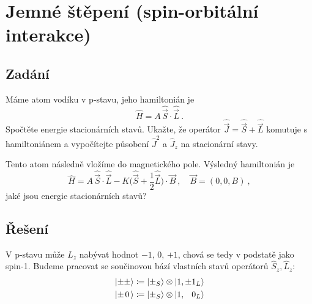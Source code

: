 \documentclass[10pt,a4paper]{article}
\def\ph{\phantom}
\newcommand*{\mask}[2]{%
    \mathord{\makebox[\widthof{\(#1\)}]{\(#2\)}}%
}
\newcommand{\ket}[1]{\left| #1 \right>}
\newcommand{\vechat}[1]{\hat{\vec{#1}}}
\def\0{\mask{+}{0}}
\begin{document}
\section{Jemné štěpení (spin-orbitální interakce)}

\subsection{Zadání}
Máme atom vodíku v p-stavu, jeho hamiltonián je
\begin{equation*}
    \hat H = A \, \vechat S \cdot \vechat L \: .
\end{equation*}
Spočtěte energie stacionárních stavů. Ukažte, že operátor $\vechat J = \vechat S + \vechat L$ komutuje s hamiltoniánem a vypočítejte působení $\hat J^2$ a $\hat J_z$ na stacionární stavy.

Tento atom následně vložíme do magnetického pole. Výsledný hamiltonián je
\begin{equation*}
    \hat H
    = A \, \vechat S \cdot \vechat L
    - K \big( \vechat S + \frac{1}{2} \vechat L \big) \cdot \vec B
    \: , \quad
    \vec B = (0, 0, B)
    \: ,
\end{equation*}
jaké jsou energie stacionárních stavů?

\subsection{Řešení}
V p-stavu může $L_z$ nabývat hodnot $-1$, $0$, $+1$, chová se tedy v podstatě jako spin-1. Budeme pracovat se součinovou bází vlastních stavů operátorů $\hat S_z, \hat L_z$:
\begin{align*}
    \ket{\pm\pm} &\coloneqq
    \ket{\pm_S} \otimes \ket{1, \pm 1_L}
    \\
    \ket{\pm\0} &\coloneqq
    \ket{\pm_S} \otimes \ket{1, \ph{\pm} 0_L}
\end{align*}
\end{document}
